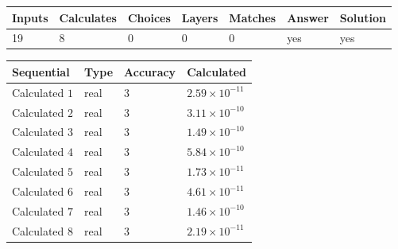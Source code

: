 \documentclass[12pt]{article}
\begin{document}
 

 
\vspace{0.3in}
   
   
   
   
\noindent\begin{tabular}{|l|l|l|l|l|l|l|}
 \hline
Inputs & Calculates & Choices & Layers & Matches & Answer & Solution \\ \hline
          19 & 
           8 & 
           0
  & 
           0 & 
           0 & 
  yes & 
  yes 
  \\ \hline
 \end{tabular}
   
   
   
   
\noindent{}
   
   
  
  
\noindent\begin{tabular}{|l|l|l|l|}
\hline
 Sequential & Type & Accuracy & Calculated \\ 
\hline
 
 
  Calculated $           1$ & real & $           3 $ & 
 $ 2.59 \times 10^{-11} $ 
 \\  \hline  
 
 
  Calculated $           2$ & real & $           3 $ & 
 $ 3.11 \times 10^{-10} $ 
 \\  \hline  
 
 
  Calculated $           3$ & real & $           3 $ & 
 $ 1.49 \times 10^{-10} $ 
 \\  \hline  
 
 
  Calculated $           4$ & real & $           3 $ & 
 $ 5.84 \times 10^{-10} $ 
 \\  \hline  
 
 
  Calculated $           5$ & real & $           3 $ & 
 $ 1.73 \times 10^{-11} $ 
 \\  \hline  
 
 
  Calculated $           6$ & real & $           3 $ & 
 $ 4.61 \times 10^{-11} $ 
 \\  \hline  
 
 
  Calculated $           7$ & real & $           3 $ & 
 $ 1.46 \times 10^{-10} $ 
 \\  \hline  
 
 
  Calculated $           8$ & real & $           3 $ & 
 $ 2.19 \times 10^{-11} $ 
 \\  \hline  
 \end{tabular}
   
\end{document}

